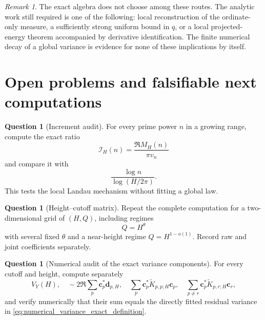 \documentclass[11pt]{amsart}
\numberwithin{equation}{section}
\theoremstyle{plain}
\theoremstyle{definition}
\newtheorem{question}[theorem]{Question}
\theoremstyle{remark}
\newtheorem{remark}[theorem]{Remark}
\newcommand{\1}{\mathbf{1}}
\begin{document}
\begin{remark}
\label{rem:routes_summary_missing_estimates}
The exact algebra does not choose among these routes.  The analytic work
still required is one of the following: local reconstruction of the
ordinate-only measure, a sufficiently strong uniform bound in \(q\), or a
local projected-energy theorem accompanied by derivative identification.
The finite numerical decay of a global variance is evidence for none of
these implications by itself.
\end{remark}


\section{Open problems and falsifiable next computations}
\label{sec:open_problems}

\begin{question}[Increment audit]
\label{question:increment_audit}
For every prime power \(n\) in a growing range, compute the exact ratio
\begin{equation}
\mathcal I_H(n)
=
\frac{\Re M_H(n)}{\pi v_n}
\label{eq:increment_audit_ratio}
\end{equation}
and compare it with
\begin{equation}
\frac{\log n}{\log(H/2\pi)}.
\label{eq:increment_audit_prediction}
\end{equation}
This tests the local Landau mechanism without fitting a global law.
\end{question}

\begin{question}[Height--cutoff matrix]
\label{question:height_cutoff_matrix}
Repeat the complete computation for a two-dimensional grid of
\((H,Q)\), including regimes
\begin{equation}
Q=H^\theta
\label{eq:height_cutoff_regime}
\end{equation}
with several fixed \(\theta\) and a near-height regime
\(Q=H^{1-o(1)}\).  Record raw and joint coefficients separately.
\end{question}

\begin{question}[Numerical audit of the exact variance components]
\label{question:projected_tower_blocks}
For every cutoff and height, compute separately
\begin{equation}
V_Y(H),
\quad
-2\Re\sum_p\mathbf c_p^\ast\mathbf d_{p,H},
\quad
\sum_p\mathbf c_p^\ast\widetilde K_{p,p;H}\mathbf c_p,
\quad
\sum_{p\neq r}\mathbf c_p^\ast\widetilde K_{p,r;H}\mathbf c_r,
\label{eq:numerical_variance_components}
\end{equation}
and verify numerically that their sum equals the directly fitted residual
variance in \eqref{eq:numerical_variance_exact_definition}.
\end{question}
\end{document}
